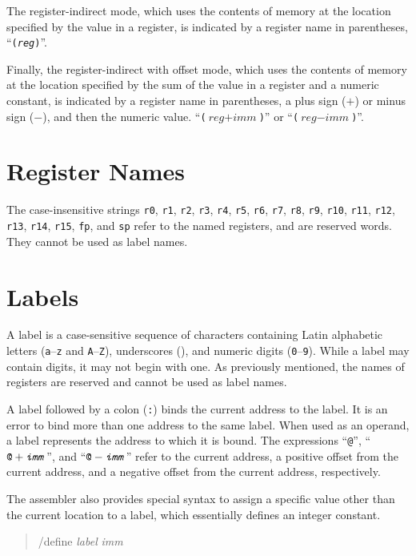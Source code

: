 \documentclass[12pt,english]{book}
\newcommand*{\asmstyle}{\noindent\ttfamily\selectfont\small}
\begin{document}
The register-indirect mode,
which uses the contents of memory
at the location specified by the value in a register,
is indicated by a register name in parentheses,
``\texttt{(\textit{reg})}''.

Finally, the register-indirect with offset mode,
which uses the contents of memory
at the location specified by the sum of
the value in a register and a numeric constant,
is indicated by a register name in parentheses,
a plus sign (\texttt{\(+\)}) or minus sign (\texttt{\(-\)}),
and then the numeric value.
``\texttt{(\(\textit{reg}+\textit{imm}\))}'' or
``\texttt{(\(\textit{reg}-\textit{imm}\))}''.

\section{Register Names}
The case-insensitive strings
\texttt{r0}, \texttt{r1}, \texttt{r2}, \texttt{r3},
\texttt{r4}, \texttt{r5}, \texttt{r6}, \texttt{r7},
\texttt{r8}, \texttt{r9}, \texttt{r10}, \texttt{r11},
\texttt{r12}, \texttt{r13}, \texttt{r14}, \texttt{r15},
\texttt{fp}, and \texttt{sp}
refer to the named registers, and are reserved words.
They cannot be used as label names.

\section{Labels}
A label is a case-sensitive sequence of characters
containing Latin alphabetic letters
(\texttt{a}--\texttt{z} and \texttt{A}--\texttt{Z}),
underscores (\texttt{\textunderscore}),
and numeric digits (\texttt{0}--\texttt{9}).
While a label may contain digits, it may not begin with one.
As previously mentioned, the names of registers are reserved
and cannot be used as label names.

A label followed by a colon (\texttt{:})
binds the current address to the label.
It is an error to bind more than one address to the same label.
When used as an operand,
a label represents the address to which it is bound.
The expressions ``\texttt{@}'',
``\(\texttt{@}+\texttt{\textit{imm}}\)'',
and ``\(\texttt{@}-\texttt{\textit{imm}}\)''
refer to the current address,
a positive offset from the current address,
and a negative offset from the current address,
respectively.

The assembler also provides special syntax to assign
a specific value other than the current location to a label,
which essentially defines an integer constant.
\begin{quote}\asmstyle
/define \textit{label} \textit{imm}
\end{quote}
\end{document}
